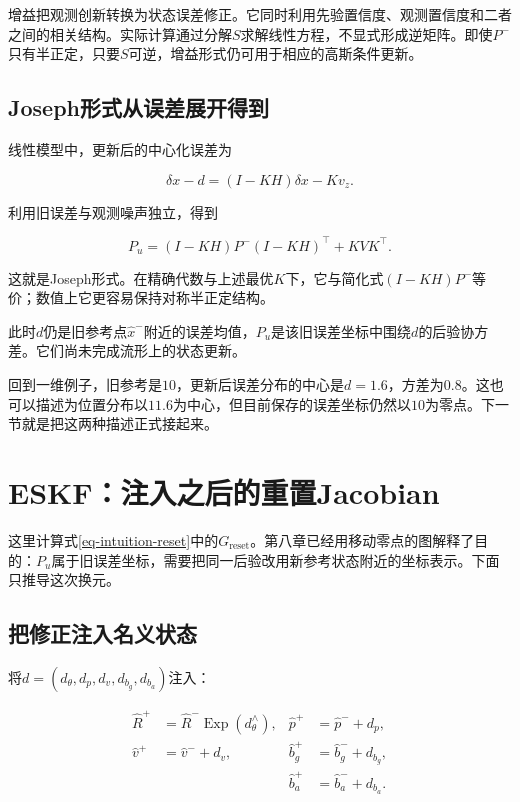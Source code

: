 增益把观测创新转换为状态误差修正。它同时利用先验置信度、观测置信度和二者之间的相关结构。实际计算通过分解$S$求解线性方程，不显式形成逆矩阵。即使$P^-$只有半正定，只要$S$可逆，增益形式仍可用于相应的高斯条件更新。

\subsection{Joseph形式从误差展开得到}

线性模型中，更新后的中心化误差为

\begin{equation*}
\delta x-d=(I-KH)\delta x-Kv_z.
\end{equation*}

利用旧误差与观测噪声独立，得到

\begin{equation*}
\boxed{P_u=(I-KH)P^-(I-KH)^\top+KVK^\top.}
\end{equation*}

这就是Joseph形式。在精确代数与上述最优$K$下，它与简化式$(I-KH)P^-$等价；数值上它更容易保持对称半正定结构。

此时$d$仍是旧参考点$\hat x^-$附近的误差均值，$P_u$是该旧误差坐标中围绕$d$的后验协方差。它们尚未完成流形上的状态更新。

回到一维例子，旧参考是$10$，更新后误差分布的中心是$d=1.6$，方差为$0.8$。这也可以描述为位置分布以$11.6$为中心，但目前保存的误差坐标仍然以$10$为零点。下一节就是把这两种描述正式接起来。

\section{ESKF：注入之后的重置Jacobian}

这里计算式\eqref{eq-intuition-reset}中的$G_{\mathrm{reset}}$。第八章已经用移动零点的图解释了目的：$P_u$属于旧误差坐标，需要把同一后验改用新参考状态附近的坐标表示。下面只推导这次换元。

\subsection{把修正注入名义状态}

将$d=(d_\theta,d_p,d_v,d_{b_g},d_{b_a})$注入：

\begin{equation*}
\begin{aligned}
 \hat R^+&=\hat R^-\mathop{\mathrm{Exp}}(d_\theta^\wedge),&
 \hat p^+&=\hat p^-+d_p,\\
 \hat v^+&=\hat v^-+d_v,&
 \hat b_g^+&=\hat b_g^-+d_{b_g},\\
 &&\hat b_a^+&=\hat b_a^-+d_{b_a}.
\end{aligned}
\end{equation*}

